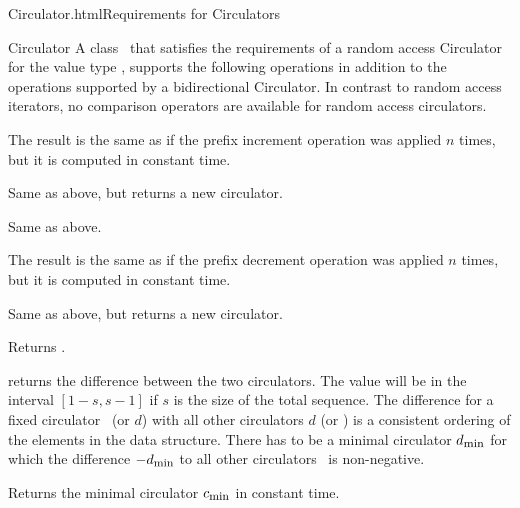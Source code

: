 \begin{ccHtmlClassFile}{Circulator.html}{Requirements for Circulators}
\begin{ccClass}{Circulator}
A class \ccClassName\ that satisfies the requirements of a random
access Circulator for the value type , supports the
following operations in addition to the operations supported by a
bidirectional Circulator.  In contrast to random access iterators, 
no comparison operators are available for
random access circulators.

\ccTypes
{}


\ccPropagateThreeToTwoColumns
{}
\ccOperations

{The result is the same as if the prefix increment operation 
 was applied $n$ times, but it is computed in constant time.}

{Same as above, but returns a new circulator.}

\def\ccTagRmEigenClassName{\ccTrue}
{Same as above.}
\def\ccTagRmEigenClassName{\ccFalse}

{The result is the same as if the prefix decrement operation 
 was applied $n$ times, but it is computed in constant time.}

{Same as above, but returns a new circulator.}


{Returns .}

{returns the difference between the two circulators. The value will be
  in the interval $\left[ 1-s , s-1 \right]$ if $s$ is the size of the
  total sequence. The difference for a fixed circulator \ccVar\ (or
  $d$) with all other circulators $d$ (or \ccVar) is a consistent
  ordering of the elements in the data structure. There has to be a
  minimal circulator $d_{\mbox{\footnotesize min}}$ for which the
  difference \ccVar $- d_{\mbox{\footnotesize min}}$ to all other
  circulators \ccVar\ is non-negative.}

{Returns the minimal circulator $c_{\mbox{\footnotesize min}}$
  in constant time.} 

\end{ccClass} 
\end{ccHtmlClassFile} 

